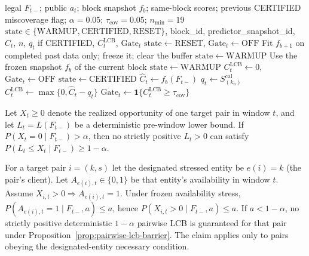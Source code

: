 \begin{algorithm}[t]
\caption{Aggregate coverage certificate (diagnostic Gate)}
\label{alg:agg_certificate}
\begin{algorithmic}[1]
\REQUIRE legal $F_{t-}$; public $a_t$; block snapshot $f_b$; same-block scores;
previous CERTIFIED miscoverage flag; $\alpha=0.05$; $\tau_{\mathrm{cov}}=0.05$; $n_{\min}=19$
\ENSURE $\mathrm{state}\in\{\mathrm{WARMUP},\mathrm{CERTIFIED},\mathrm{RESET}\}$,
block\_id, predictor\_snapshot\_id, $\widehat C_t$, $n$, $q_t$ if CERTIFIED,
$C^{\mathrm{LCB}}_t$, $\mathrm{Gate}_t$
\STATE $\mathrm{state}\leftarrow\mathrm{RESET}$, $\mathrm{Gate}_t\leftarrow\mathrm{OFF}$
\STATE Fit $f_{b+1}$ on completed past data only; freeze it; clear the buffer
\STATE $\mathrm{state}\leftarrow\mathrm{WARMUP}$
\ELSE
\STATE Use the frozen snapshot $f_b$ of the current block
\STATE $\mathrm{state}\leftarrow\mathrm{WARMUP}$
\STATE $C^{\mathrm{LCB}}_t\leftarrow 0$, $\mathrm{Gate}_t\leftarrow\mathrm{OFF}$
\ELSE
\STATE $\mathrm{state}\leftarrow\mathrm{CERTIFIED}$ 
\STATE $\widehat C_t\leftarrow f_b(F_{t-})$
\STATE $q_t\leftarrow S_{(k_n)}^{\mathrm{cal}}$ 
\STATE $C^{\mathrm{LCB}}_t\leftarrow\max\{0,\widehat C_t-q_t\}$
\STATE $\mathrm{Gate}_t\leftarrow \mathbf{1}\{C^{\mathrm{LCB}}_t\ge\tau_{\mathrm{cov}}\}$
\ENDIF
\ENDIF
\end{algorithmic}
\end{algorithm}

\begin{proposition}
\label{prop:pairwise-lcb-barrier}
Let $X_t\ge 0$ denote the realized opportunity of one target pair in window
$t$, and let $L_t=L(F_{t-})$ be a deterministic pre-window lower bound.  If
$P(X_t=0\mid F_{t-})>\alpha$, then no strictly positive $L_t>0$ can satisfy
$P(L_t\le X_t\mid F_{t-})\ge 1-\alpha$.
\end{proposition}

\begin{corollary}
\label{cor:availability-barrier}
For a target pair $i=(k,s)$ let the designated stressed entity be $e(i)=k$
(the pair's client).  Let $A_{e(i),t}\in\{0,1\}$ be that entity's availability
in window $t$.  Assume $X_{i,t}>0\Rightarrow A_{e(i),t}=1$.  Under frozen
availability stress, $P(A_{e(i),t}=1\mid F_{t-},a)\le a$, hence
$P(X_{i,t}>0\mid F_{t-},a)\le a$.  If $a<1-\alpha$, no strictly positive
deterministic $1-\alpha$ pairwise LCB is guaranteed for that pair under
Proposition~\ref{prop:pairwise-lcb-barrier}.  The claim applies only to pairs
obeying the designated-entity necessary condition.
\end{corollary}

